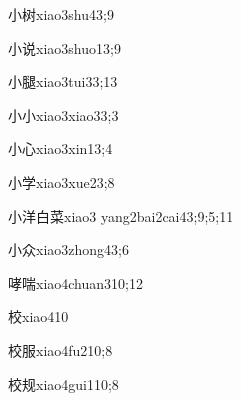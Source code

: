 \begin{verbete}{小树}{xiao3shu4}{3;9}
\end{verbete}

\begin{verbete}{小说}{xiao3shuo1}{3;9}
\end{verbete}

\begin{verbete}{小腿}{xiao3tui3}{3;13}
\end{verbete}

\begin{verbete}{小小}{xiao3xiao3}{3;3}
\end{verbete}

\begin{verbete}{小心}{xiao3xin1}{3;4}
\end{verbete}

\begin{verbete}{小学}{xiao3xue2}{3;8}
\end{verbete}

\begin{verbete}{小洋白菜}{xiao3 yang2bai2cai4}{3;9;5;11}
\end{verbete}

\begin{verbete}{小众}{xiao3zhong4}{3;6}
\end{verbete}

\begin{verbete}{哮喘}{xiao4chuan3}{10;12}
\end{verbete}

\begin{verbete}{校}{xiao4}{10}
\end{verbete}

\begin{verbete}{校服}{xiao4fu2}{10;8}
\end{verbete}

\begin{verbete}{校规}{xiao4gui1}{10;8}
\end{verbete}

